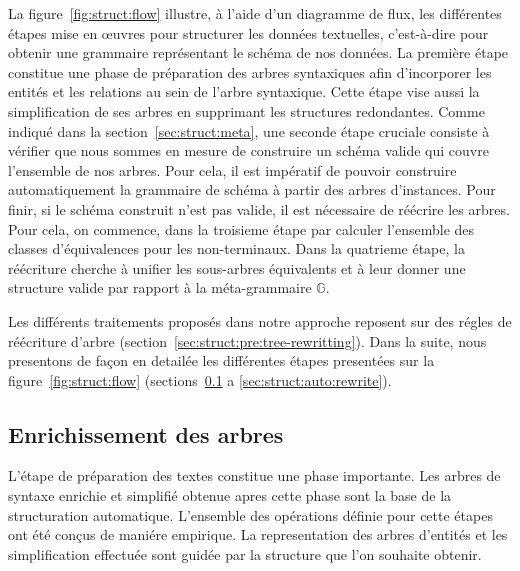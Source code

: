La figure~\ref{fig:struct:flow} illustre, à l'aide d'un diagramme de flux, les différentes étapes mise en œuvres pour structurer les données textuelles, c'est-à-dire pour obtenir une grammaire représentant le schéma de nos données.
La première étape constitue une phase de préparation des arbres syntaxiques afin d'incorporer les entités et les relations au sein de l'arbre syntaxique.
Cette étape vise aussi la simplification de ses arbres en supprimant les structures redondantes.
Comme indiqué dans la section~\ref{sec:struct:meta}, une seconde étape cruciale consiste à vérifier que nous sommes en mesure de construire un schéma valide qui couvre l'ensemble de nos arbres.
Pour cela, il est impératif de pouvoir construire automatiquement la grammaire de schéma à partir des arbres d'instances.
Pour finir, si le schéma construit n'est pas valide, il est nécessaire de réécrire les arbres.
Pour cela, on commence, dans la troisieme étape par calculer l'ensemble des classes d'équivalences pour les non-terminaux.
Dans la quatrieme étape, la réécriture cherche à unifier les sous-arbres équivalents et à leur donner une structure valide par rapport à la méta-grammaire $\mathbb{G}$.

Les différents traitements proposés dans notre approche reposent sur des régles de réécriture d'arbre (section~\ref{sec:struct:pre:tree-rewritting}).
Dans la suite, nous presentons de façon en detailée les différentes étapes presentées sur la figure~\ref{fig:struct:flow} (sections~\ref{sec:struct:auto:text} a \ref{sec:struct:auto:rewrite}).

\subsection{Enrichissement des arbres}
\label{sec:struct:auto:text}
L'étape de préparation des textes constitue une phase importante.
Les arbres de syntaxe enrichie et simplifié obtenue apres cette phase sont la base de la structuration automatique.
L'ensemble des opérations définie pour cette étapes ont été conçus de maniére empirique.
La representation des arbres d'entités et les simplification effectuée sont guidée par la structure que l'on souhaite obtenir.


